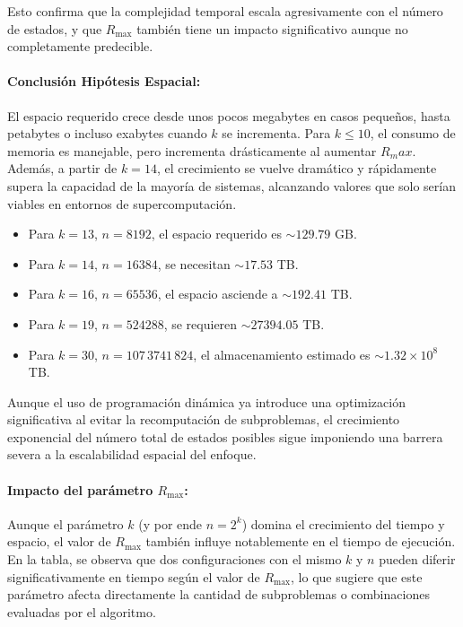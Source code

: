 \documentclass[11pt,letter]{article}
\begin{document}
\begin{itemize}
Esto confirma que la complejidad temporal escala agresivamente con el número de estados, y que \(R_{\max}\) también tiene un impacto significativo aunque no completamente predecible.

\paragraph{Conclusión Hipótesis Espacial:}
El espacio requerido crece desde unos pocos megabytes en casos pequeños, hasta petabytes o incluso exabytes cuando \(k\) se incrementa. Para \(k \le 10\), el consumo de memoria es manejable, pero incrementa drásticamente al aumentar \(R_max\). Además, a partir de \(k=14\), el crecimiento se vuelve dramático y rápidamente supera la capacidad de la mayoría de sistemas, alcanzando valores que solo serían viables en entornos de supercomputación.

\begin{itemize}
  \item Para \(k=13\), \(n=8192\), el espacio requerido es \(\sim129.79\) GB.
  \item Para \(k=14\), \(n=16384\), se necesitan \(\sim17.53\) TB.
  \item Para \(k=16\), \(n=65536\), el espacio asciende a \(\sim192.41\) TB.
  \item Para \(k=19\), \(n=524288\), se requieren \(\sim27394.05\) TB.
  \item Para \(k=30\), \(n=107\,3741\,824\), el almacenamiento estimado es \(\sim1.32\times10^8\) TB.
\end{itemize}

Aunque el uso de programación dinámica ya introduce una optimización significativa al evitar la recomputación de subproblemas, el crecimiento exponencial del número total de estados posibles sigue imponiendo una barrera severa a la escalabilidad espacial del enfoque. 


\paragraph{Impacto del parámetro \texorpdfstring{$R_{\max}$}{Rmax}:}
Aunque el parámetro \(k\) (y por ende \(n = 2^k\)) domina el crecimiento del tiempo y espacio, el valor de \(R_{\max}\) también influye notablemente en el tiempo de ejecución. En la tabla, se observa que dos configuraciones con el mismo \(k\) y \(n\) pueden diferir significativamente en tiempo según el valor de \(R_{\max}\), lo que sugiere que este parámetro afecta directamente la cantidad de subproblemas o combinaciones evaluadas por el algoritmo.


\end{itemize}
\end{document}
